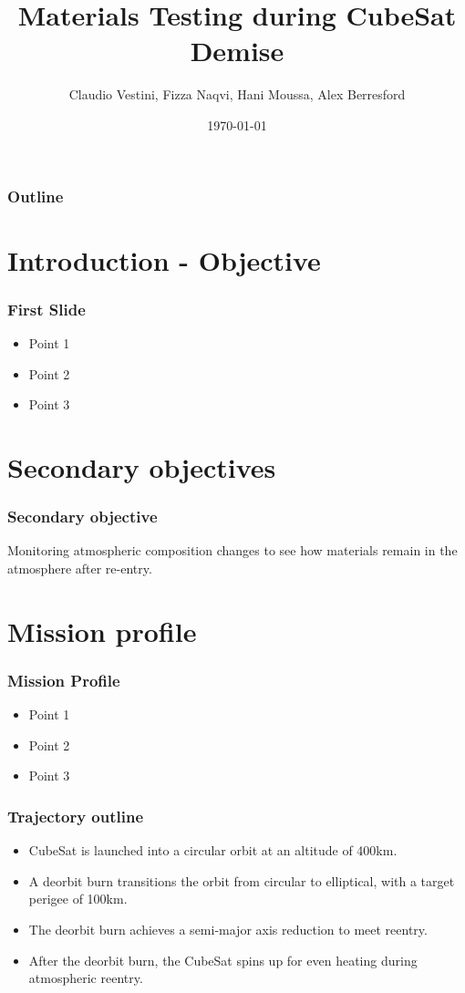 \documentclass{beamer}
\title{Materials Testing during CubeSat Demise}
\author{Claudio Vestini, Fizza Naqvi, Hani Moussa, Alex Berresford}
\institute{University of Oxford}
\date{\today}
\begin{document}
\frame{\titlepage}

\begin{frame}
    \frametitle{Outline}
    \tableofcontents
\end{frame}

\section{Introduction - Objective}
\begin{frame}
    \frametitle{First Slide}
    \begin{itemize}
        \item Point 1
        \item Point 2
        \item Point 3
    \end{itemize}
\end{frame}

\section{Secondary objectives}
\begin{frame}
    \frametitle{Secondary objective}
    Monitoring atmospheric composition changes to see how materials remain in the atmosphere after re-entry.
\end{frame}

\section{Mission profile}

\begin{frame}
    \frametitle{Mission Profile}
    \begin{itemize}
        \item Point 1
        \item Point 2
        \item Point 3
    \end{itemize}
\end{frame}

\begin{frame}
    \frametitle{Trajectory outline}
        \begin{itemize}
        \item CubeSat is launched into a circular orbit at an altitude of 400km.
        \item A deorbit burn transitions the orbit from circular to elliptical, with a target perigee of 100km.
        \item The deorbit burn achieves a semi-major axis reduction to meet reentry.
        \item After the deorbit burn, the CubeSat spins up for even heating during atmospheric reentry.
        
    \end{itemize}
\end{frame}
\end{document}
